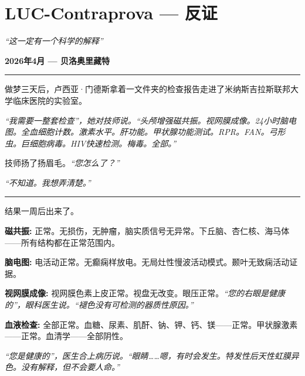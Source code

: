 \section*{\textbf{LUC-Contraprova} --- 反证}

\noindent \textit{\textquotedblleft{}这一定有一个科学的解释\textquotedblright{}}

\noindent \textbf{2026年4月 --- 贝洛奥里藏特}

\vspace{0.5em}\noindent\rule{\textwidth}{0.5pt}\vspace{0.5em}

\noindent 做梦三天后，卢西亚·门德斯拿着一文件夹的检查报告走进了米纳斯吉拉斯联邦大学临床医院的实验室。

\noindent \textit{\textquotedblleft{}我需要一整套检查\textquotedblright{}，她对技师说。\textquotedblleft{}头颅增强磁共振。视网膜成像。24小时脑电图。全血细胞计数。激素水平。肝功能。甲状腺功能测试。RPR。FAN。弓形虫。巨细胞病毒。HIV快速检测。梅毒。全部。\textquotedblright{}}

\noindent 技师扬了扬眉毛。\textit{\textquotedblleft{}您怎么了？\textquotedblright{}}

\noindent \textit{\textquotedblleft{}不知道。我想弄清楚。\textquotedblright{}}

\vspace{0.5em}\noindent\rule{\textwidth}{0.5pt}\vspace{0.5em}

\noindent 结果一周后出来了。

\noindent \textbf{磁共振:} 正常。无损伤，无肿瘤，脑实质信号无异常。下丘脑、杏仁核、海马体——所有结构都在正常范围内。

\noindent \textbf{脑电图:} 电活动正常。无癫痫样放电。无局灶性慢波活动模式。颞叶无致痫活动证据。

\noindent \textbf{视网膜成像:} 视网膜色素上皮正常。视盘无改变。眼压正常。\textit{\textquotedblleft{}您的右眼是健康的\textquotedblright{}，眼科医生说。\textquotedblleft{}褪色没有可检测的器质性原因。\textquotedblright{}}

\noindent \textbf{血液检查:} 全部正常。血糖、尿素、肌酐、钠、钾、钙、镁——正常。甲状腺激素——正常。血清学——全部阴性。

\noindent \textit{\textquotedblleft{}您是健康的\textquotedblright{}，医生合上病历说。\textquotedblleft{}眼睛……嗯，有时会发生。特发性后天性虹膜异色。没有解释，但不会要人命。\textquotedblright{}}

